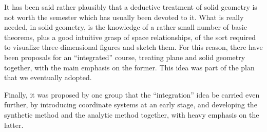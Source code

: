 It has been said rather plausibly that a deductive treatment of solid
geometry is not worth the semester which has usually been devoted to
it. What is really needed, in solid geometry, is the knowledge of a
rather small number of basic theorems, plus a good intuitive grasp of
space relationships, of the sort required to visualize
three-dimensional figures and sketch them. For this reason, there have
been proposals for an ``integrated'' course, treating plane and solid
geometry together, with the main emphasis on the former. This idea was
part of the plan that we eventually adopted.

Finally, it was proposed by one group that the ``integration'' idea be
carried even further, by introducing coordinate systems at an early
stage, and developing the synthetic method and the  analytic method
together, with heavy emphasis on the latter.

